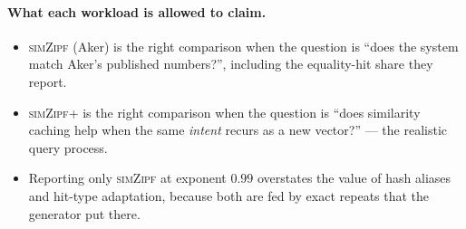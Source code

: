 \paragraph{What each workload is allowed to claim.}
\begin{itemize}
  \item \textsc{simZipf} (Aker) is the right comparison when the
        question is ``does the system match Aker's published
        numbers?'', including the equality-hit share they report.
  \item \textsc{simZipf+} is the right comparison when the question is
        ``does similarity caching help when the same \emph{intent}
        recurs as a new vector?'' --- the realistic query process.
  \item Reporting only \textsc{simZipf} at exponent $0.99$ overstates
        the value of hash aliases and hit-type adaptation, because both
        are fed by exact repeats that the generator put there.
\end{itemize}
